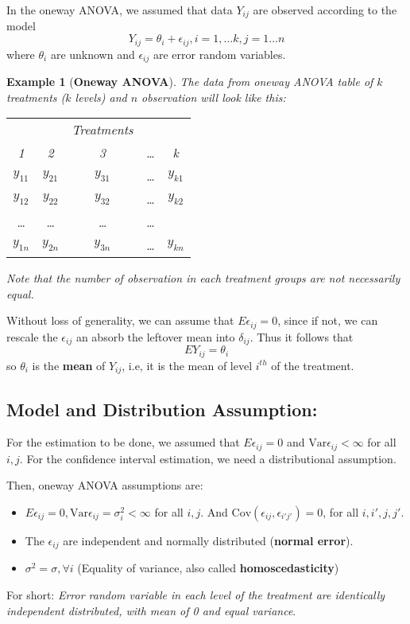 \documentclass[11pt]{article}
\newtheorem{ex}{Example}[section]
\begin{document}
	 In the oneway ANOVA, we assumed that data $Y_{ij}$ are observed according to the model
	 $$Y_{ij} = \theta_i + \epsilon_{ij}, i = 1, \dots k, j = 1 \dots n $$
	 where $\theta_i$ are unknown and $\epsilon_{ij}$ are error random variables. 
	 \begin{ex}[\textbf{Oneway ANOVA}] 
	 	The data from oneway ANOVA table of $k$  treatments ($k$ levels) and $n$ observation will look like this: 
	 \begin{center}
	 		\begin{tabular}{ccccc}
	 		\hline
	 		&  &Treatments \\ 
	 		1 & 2 & 3 & \dots & k \\
	 		\hline
	 		$y_{11} $& $y_{21} $& $y_{31} $& \dots & $y_{k1}$ \\
	 		$y_{12}$ & $y_{22}$ & $y_{32}$ & \dots & $y_{k2}$ \\
	 		\dots & \dots & \dots &  \dots & \\
	 		$y_{1n}$ & $y_{2n} $ & $y_{3n}$ & \dots & $y_{kn}$ \\
	 		\hline

	 	\end{tabular}
	 \end{center}
	Note that the number of observation in each treatment groups are not necessarily equal.
	 \end{ex}

Without loss of generality, we can assume that $ E\epsilon_{ij} = 0$, since if not, we can rescale the $\epsilon_{ij}$ an absorb the leftover mean into $\delta_{ij}$. Thus it follows that
$$EY_{ij} = \theta_i $$
so $\theta_i$ is the \textbf{mean } of $Y_{ij}$, i.e, it is the mean of level  $i^{th}$ of the treatment. 
\subsection{Model and Distribution Assumption: }
For the estimation to be done, we assumed that $E\epsilon_{ij} = 0$ and $\text{Var}\epsilon_{ij} < \infty$ for all $i, j$. For the confidence interval estimation, we need a distributional assumption. 

Then, oneway ANOVA assumptions are:
\begin{itemize}
	\item $E\epsilon_{ij} = 0, \text{Var}\epsilon_{ij} = \sigma_i^2 < \infty$ for all $i, j$. And $\text{Cov}(\epsilon_{ij}, \epsilon_{i'j'}) = 0$, for all $i, i',j , j'$.
	\item The $\epsilon_{ij}$ are independent and normally distributed (\textbf{normal error}).
	\item $\sigma^2 = \sigma, \forall i $ (Equality of variance, also called \textbf{homoscedasticity})
\end{itemize}
For short: \textit{Error random variable in each level of the treatment are identically independent distributed, with mean of 0 and equal variance}.
\end{document}
